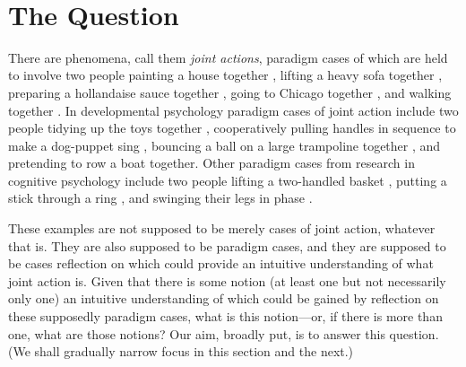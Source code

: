 \documentclass[12pt,a4paper]{extarticle}
\begin{document}
\tableofcontents

\ 


\section{The Question}
	\label{section_the_question}

There are phenomena, call them \emph{joint actions}, paradigm cases of which are held to involve two people 
	painting a house together \citep{Bratman:1992mi}, 
	lifting a heavy sofa together \citep{Velleman:1997oo}, 
	preparing a hollandaise sauce together \citep{Searle:1990em}, 
	going to Chicago together \citep{Kutz:2000si}, 
	and walking together \citep{gilbert_walking_1990}.
In developmental psychology paradigm cases of joint action include  two people 
	tidying up the toys together \citep{Behne:2005qh},
	cooperatively pulling handles in sequence to make a dog-puppet sing \citep{Brownell:2006gu},
	bouncing a ball on a large trampoline together \citep{Tomasello:2007gl},
	and pretending to row a boat together.
Other paradigm cases from research in cognitive psychology include two people
	lifting a two-handled basket  \citep{Knoblich:2008hy},
	putting a stick through a ring \citep{ramenzoni_joint_2011},
	and swinging their legs in phase \citep[p. 284]{schmidt_richardons:_2008}.

These examples are not supposed to be merely cases of joint action, whatever that is.
They are also supposed to be paradigm cases, 
and they are supposed to be cases reflection on which could provide an intuitive understanding of what joint action is.
Given that there is some notion (at least one but not necessarily only one) an intuitive understanding of which could be gained by reflection on these supposedly paradigm cases, what is this notion---or, if there is more than one, what are those notions?
Our aim, broadly put, is to answer this question.
(We shall gradually narrow focus in this section and the next.)
\end{document}
